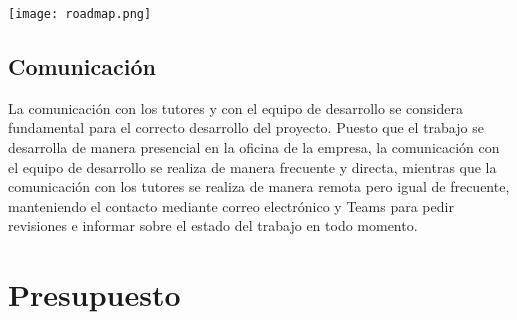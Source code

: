 \begin{minipage}{\linewidth}
	\texttt{[image: roadmap.png]}
\end{minipage}

\subsection{Comunicación}\label{subsec:comunicación}
La comunicación con los tutores y con el equipo de desarrollo se considera fundamental para el
correcto desarrollo del proyecto. Puesto que el trabajo se desarrolla de manera presencial en
la oficina de la empresa, la comunicación con el equipo de desarrollo se realiza de manera
frecuente y directa, mientras que la comunicación con los tutores se realiza de manera remota
pero igual de frecuente, manteniendo el contacto mediante correo electrónico y Teams para
pedir revisiones e informar sobre el estado del trabajo en todo momento.
\newpage{}
\section{Presupuesto}\label{sec:presupuesto}

